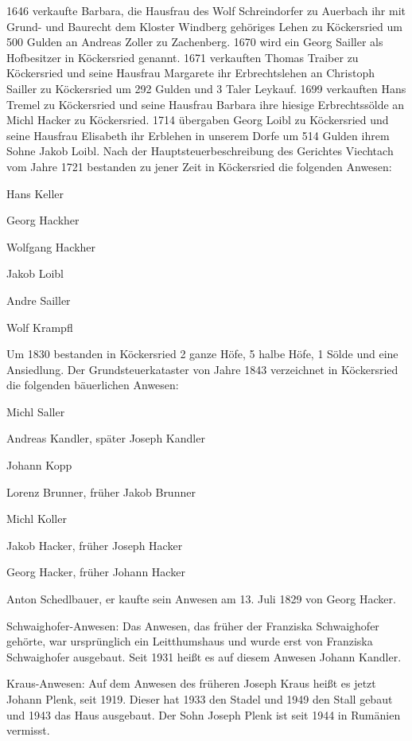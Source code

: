 1646 verkaufte Barbara, die Hausfrau des Wolf Schreindorfer zu Auerbach ihr mit
Grund- und Baurecht dem Kloster Windberg gehöriges Lehen zu Köckersried um 500
Gulden an Andreas Zoller zu Zachenberg. 1670 wird ein Georg Sailler als
Hofbesitzer in Köckersried genannt. 1671 verkauften Thomas Traiber zu
Köckersried und seine Hausfrau Margarete ihr Erbrechtslehen an Christoph Sailler
zu Köckersried um 292 Gulden und 3 Taler Leykauf. 1699 verkauften Hans Tremel zu
Köckersried und seine Hausfrau Barbara ihre hiesige Erbrechtssölde an Michl
Hacker zu Köckersried. 1714 übergaben Georg Loibl zu Köckersried und seine
Hausfrau Elisabeth ihr Erblehen in unserem Dorfe um 514 Gulden ihrem Sohne Jakob
Loibl. Nach der Hauptsteuerbeschreibung des Gerichtes Viechtach vom Jahre 1721
bestanden zu jener Zeit in Köckersried die folgenden Anwesen:



Hans Keller

Georg Hackher

Wolfgang Hackher

Jakob Loibl

Andre Sailler

Wolf Krampfl



Um 1830 bestanden in Köckersried 2 ganze Höfe, 5 halbe Höfe, 1 Sölde und eine
Ansiedlung. Der Grundsteuerkataster von Jahre 1843 verzeichnet in Köckersried
die folgenden bäuerlichen Anwesen:



Michl Saller

Andreas Kandler, später Joseph Kandler

Johann Kopp

Lorenz Brunner, früher Jakob Brunner

Michl Koller

Jakob Hacker, früher Joseph Hacker

Georg Hacker, früher Johann Hacker

Anton Schedlbauer, er kaufte sein Anwesen am 13. Juli 1829 von Georg Hacker.



Schwaighofer-Anwesen: Das Anwesen, das früher der Franziska Schwaighofer
gehörte, war ursprünglich ein Leitthumshaus und wurde erst von Franziska
Schwaighofer ausgebaut. Seit 1931 heißt es auf diesem Anwesen Johann Kandler.

Kraus-Anwesen: Auf dem Anwesen des früheren Joseph Kraus heißt es jetzt Johann
Plenk, seit 1919. Dieser hat 1933 den Stadel und 1949 den Stall gebaut und 1943
das Haus ausgebaut. Der Sohn Joseph Plenk ist seit 1944 in Rumänien vermisst.

